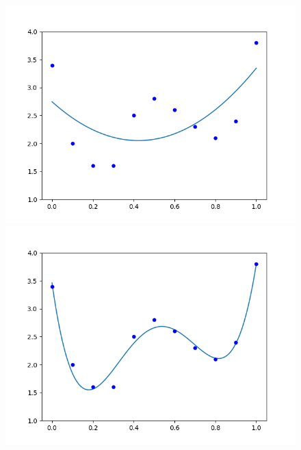 \documentclass[a4paper,11pt]{jsreport}
\begin{document}
\begin{figure}[htbp]
  \begin{minipage}[b]{0.3\linewidth}
    \centering
    \includegraphics[keepaspectratio, scale=0.3]{image/多項式回帰(a).png}
  \end{minipage}
  \begin{minipage}[b]{0.3\linewidth}
    \centering
    \includegraphics[keepaspectratio, scale=0.3]{image/多項式回帰(b).png}
  \end{minipage}
  \begin{minipage}[b]{0.3\linewidth}
    \centering

\end{minipage}
\end{figure}
\end{document}
